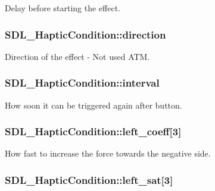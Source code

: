 Delay before starting the effect. \hypertarget{struct_s_d_l___haptic_condition_a728507d30d18998949313de3a25e5581}{
\subsubsection[{direction}]{ S\-D\-L\-\_\-\-Haptic\-Condition\-::direction}}\label{struct_s_d_l___haptic_condition_a728507d30d18998949313de3a25e5581}
Direction of the effect -\/ Not used A\-T\-M. \hypertarget{struct_s_d_l___haptic_condition_aafc182abea1078bed7e9cf5d0e713ea2}{
\subsubsection[{interval}]{ S\-D\-L\-\_\-\-Haptic\-Condition\-::interval}}\label{struct_s_d_l___haptic_condition_aafc182abea1078bed7e9cf5d0e713ea2}
How soon it can be triggered again after button. \hypertarget{struct_s_d_l___haptic_condition_a2adf52c32f60f0b6826b1e3add2eae7a}{
\subsubsection[{left\-\_\-coeff}]{ S\-D\-L\-\_\-\-Haptic\-Condition\-::left\-\_\-coeff\mbox{[}3\mbox{]}}}\label{struct_s_d_l___haptic_condition_a2adf52c32f60f0b6826b1e3add2eae7a}
How fast to increase the force towards the negative side. \hypertarget{struct_s_d_l___haptic_condition_a953448774c40818a4f47c6efea21124d}{
\subsubsection[{left\-\_\-sat}]{ S\-D\-L\-\_\-\-Haptic\-Condition\-::left\-\_\-sat\mbox{[}3\mbox{]}}}\label{struct_s_d_l___haptic_condition_a953448774c40818a4f47c6efea21124d}
